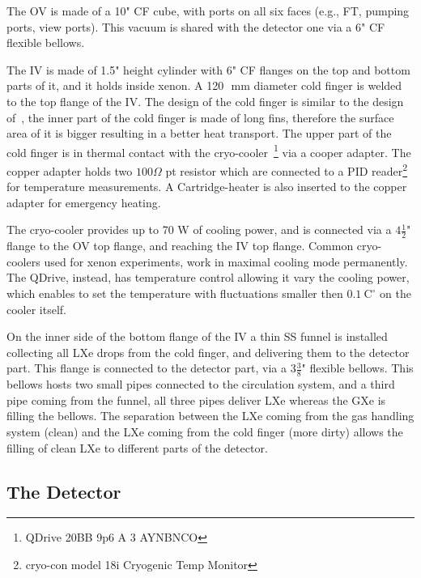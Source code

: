 The OV is made of a 10" CF cube, with ports on all six faces (e.g., FT, pumping ports, view ports). This vacuum is shared with the detector one via a 6" CF flexible bellows.

The IV is made of 1.5" height cylinder with 6" CF flanges on the top and bottom parts of it, and it holds inside xenon. A 120~\,mm diameter cold finger is welded to the top flange of the IV. The design of the cold finger is similar to the design of~\cite{xe100_instr2012}, the inner 
part of the cold finger is made of long fins, therefore the surface area of it is bigger resulting in a better heat transport. The upper 
part of the cold finger is in thermal contact with the cryo-cooler~\footnote{QDrive 20BB 9p6 A 3 AYNBNCO} via a cooper adapter. The copper 
adapter holds two $100\Omega$ pt resistor which are connected to a PID reader\footnote{cryo-con model 18i Cryogenic Temp Monitor} for 
temperature measurements. A Cartridge-heater is also inserted to the copper adapter for emergency heating. 

The cryo-cooler provides up to 70 W of cooling power, and is connected via a $4\frac{1}{2}$" flange to the OV top flange, and reaching the IV top flange. 
Common cryo-coolers used for xenon experiments, work in maximal cooling mode permanently. The QDrive, instead, has temperature control allowing 
it vary the cooling power, which enables to set the temperature with fluctuations smaller then $0.1~\mathrm{C^{\circ}}$ on the cooler itself.

On the inner side of the bottom flange of the IV a thin SS funnel is installed collecting all LXe drops from the cold finger, and delivering 
them to the  detector part. This flange is connected to the detector part, via a $3\frac{3}{8}$" flexible bellows. This bellows hosts two small pipes 
connected to the circulation system, and a third pipe coming from the funnel, all three pipes deliver LXe whereas the GXe is filling the bellows. The separation between the LXe coming from the gas handling system (clean) and the LXe coming from the cold finger (more dirty) allows the filling of clean LXe to different parts of the detector. 
\subsection{The Detector}
\label{subsec:det}
 


